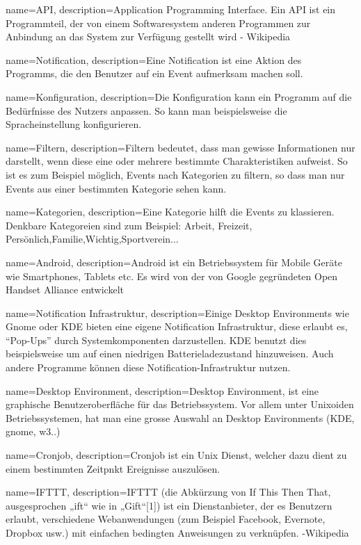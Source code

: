 {
  name=API,
  description={Application Programming Interface. Ein API ist ein Programmteil, der von einem Softwaresystem anderen
  Programmen zur Anbindung an das System zur Verfügung gestellt wird
  - Wikipedia}
} 

{
  name=Notification,
  description={Eine Notification ist eine Aktion des Programms, die den Benutzer auf ein Event aufmerksam machen soll.}
} 

{
  name=Konfiguration,
  description={Die Konfiguration kann ein Programm auf die Bedürfnisse des Nutzers anpassen. So kann man beispielsweise
   die Spracheinstellung konfigurieren.}
} 

{
  name=Filtern,
  description={Filtern bedeutet, dass man gewisse Informationen nur darstellt, wenn diese eine oder mehrere bestimmte
  Charakteristiken aufweist. So ist es zum Beispiel möglich, Events nach Kategorien zu filtern, so dass man nur Events
  aus einer bestimmten Kategorie sehen kann.}
} 


{
  name=Kategorien,
  description={Eine Kategorie hilft die Events zu klassieren. Denkbare Kategoreien sind zum Beispiel: Arbeit, Freizeit, Persönlich,Familie,Wichtig,Sportverein... }
} 

{
  name=Android,
  description={Android ist ein Betriebssystem für Mobile Geräte wie Smartphones, Tablets etc.
   Es wird von der von Google gegründeten Open Handset Alliance entwickelt}
}

{
  name=Notification Infrastruktur,
  description={Einige Desktop Environments  wie Gnome oder KDE bieten eine eigene Notification Infrastruktur, diese
  erlaubt es, ``Pop-Ups'' durch Systemkomponenten darzustellen. KDE benutzt dies beispielsweise um auf einen niedrigen
  Batterieladezustand hinzuweisen. Auch andere Programme können diese Notification-Infrastruktur nutzen. }
} 

{
  name=Desktop Environment,
  description={Desktop Environment, ist eine graphische Benutzeroberfläche für das Betriebssystem. Vor allem unter
  Unixoiden Betriebssystemen, hat man eine grosse Auswahl an Desktop Environments (KDE, gnome, w3..)}
} 

{
  name=Cronjob,
  description={Cronjob ist ein Unix Dienst, welcher dazu dient zu einem bestimmten Zeitpnkt Ereignisse auszulösen.}
} 



{
  name=IFTTT,
  description={IFTTT (die Abkürzung von If This Then That, ausgesprochen „ift“ wie in „Gift“[1]) ist ein Dienstanbieter,
  der es Benutzern erlaubt, verschiedene Webanwendungen (zum Beispiel Facebook, Evernote, Dropbox usw.) mit einfachen
  bedingten Anweisungen zu verknüpfen.
   -Wikipedia}
} 





